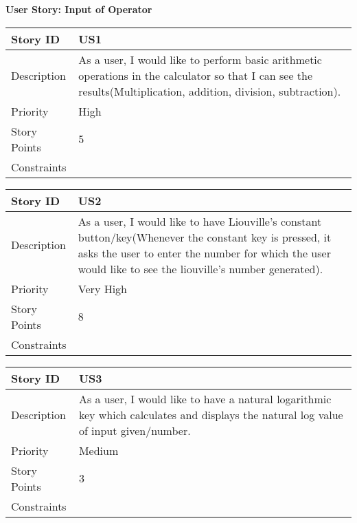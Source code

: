 \documentclass[12pt]{article}
\begin{document}
\newpage
\begin{rSection}
{\Large \textbf{User Story: Input of Operator}}\vspace{1em}
\end{rSection}
\newline
\newline
\begin{tabular}{|p{7cm}|p{10cm}| }
\hline
 Story ID & US1\\
 \hline
 Description & As a user, I would like to perform basic arithmetic operations in the calculator so that I can see the results(Multiplication, addition, division, subtraction).  \\
 \hline
 Priority & High  \\
  \hline
Story Points & 5  \\
  \hline
Constraints &   \\
  \hline
\end{tabular}
\newline
\newline
\newline
\begin{tabular}{|p{7cm}|p{10cm}| }
\hline
 Story ID & US2\\
 \hline
 Description & As a user, I would like to have Liouville's constant button/key(Whenever the constant key is pressed, it asks the user to enter the number for which the user would like to see the liouville's number generated).  \\
 \hline
 Priority & Very High  \\
  \hline
Story Points & 8  \\
  \hline
Constraints &   \\
  \hline
\end{tabular}
\newline
\newline
\newline
\begin{tabular}{|p{7cm}|p{10cm}| }
\hline
 Story ID & US3\\
 \hline
 Description & As a user, I would like to have a natural logarithmic key which calculates and displays the natural log value of input given/number.  \\
 \hline
 Priority & Medium  \\
  \hline
Story Points & 3  \\
  \hline
Constraints &   \\
  \hline
\end{tabular}
\newline
\end{document}

